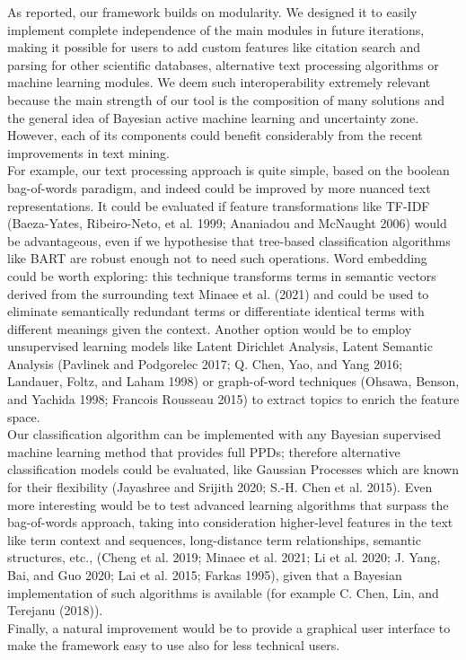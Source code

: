 \documentclass{article}
\begin{document}
As reported, our framework builds on modularity. We designed it to
easily implement complete independence of the main modules in future
iterations, making it possible for users to add custom features like
citation search and parsing for other scientific databases, alternative
text processing algorithms or machine learning modules. We deem such
interoperability extremely relevant because the main strength of our
tool is the composition of many solutions and the general idea of
Bayesian active machine learning and uncertainty zone. However, each of
its components could benefit considerably from the recent improvements
in text mining.\\
For example, our text processing approach is quite simple, based on the
boolean bag-of-words paradigm, and indeed could be improved by more
nuanced text representations. It could be evaluated if feature
transformations like TF-IDF (Baeza-Yates, Ribeiro-Neto, et al. 1999;
Ananiadou and McNaught 2006) would be advantageous, even if we
hypothesise that tree-based classification algorithms like BART are
robust enough not to need such operations. Word embedding could be worth
exploring: this technique transforms terms in semantic vectors derived
from the surrounding text Minaee et al. (2021) and could be used to
eliminate semantically redundant terms or differentiate identical terms
with different meanings given the context. Another option would be to
employ unsupervised learning models like Latent Dirichlet Analysis,
Latent Semantic Analysis (Pavlinek and Podgorelec 2017; Q. Chen, Yao,
and Yang 2016; Landauer, Foltz, and Laham 1998) or graph-of-word
techniques (Ohsawa, Benson, and Yachida 1998; Francois Rousseau 2015) to
extract topics to enrich the feature space.\\
Our classification algorithm can be implemented with any Bayesian
supervised machine learning method that provides full PPDs; therefore
alternative classification models could be evaluated, like Gaussian
Processes which are known for their flexibility (Jayashree and Srijith
2020; S.-H. Chen et al. 2015). Even more interesting would be to test
advanced learning algorithms that surpass the bag-of-words approach,
taking into consideration higher-level features in the text like term
context and sequences, long-distance term relationships, semantic
structures, etc., (Cheng et al. 2019; Minaee et al. 2021; Li et al.
2020; J. Yang, Bai, and Guo 2020; Lai et al. 2015; Farkas 1995), given
that a Bayesian implementation of such algorithms is available (for
example C. Chen, Lin, and Terejanu (2018)).\\
Finally, a natural improvement would be to provide a graphical user
interface to make the framework easy to use also for less technical
users.
\end{document}
